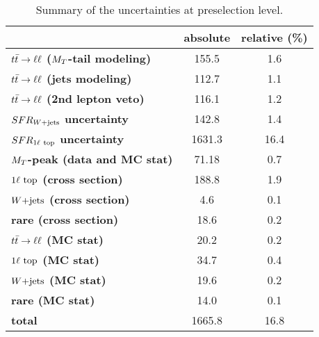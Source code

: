             \begin{table}[!ht]
                \begin{center}
                    \begin{tabular}{|l|c|c|}
                        \hline
                        & \textbf{absolute} & \textbf{relative (\%)}   \\
                        \hline
                        \textbf{$t\bar{t} \rightarrow \ell \ell$ ($M_T$-tail modeling)}       & 155.5    & 1.6  \\
                        \textbf{$t\bar{t} \rightarrow \ell \ell$ (jets modeling)}             & 112.7    & 1.1  \\
                        \textbf{$t\bar{t} \rightarrow \ell \ell$ (2nd lepton veto)}           & 116.1    & 1.2  \\
                        \textbf{$SFR_{\text{$W$+jets}}$ uncertainty}                    & 142.8    & 1.4  \\
                        \textbf{$SFR_{1\ell~\text{top}}$ uncertainty}             & 1631.3   & 16.4 \\
                        \textbf{$M_T$-peak (data and MC stat)}              & 71.18    & 0.7  \\
                        \textbf{$1\ell~\text{top}$ (cross section)}            & 188.8    & 1.9  \\
                        \textbf{$\text{$W$+jets}$ (cross section)}                   & 4.6      & 0.1  \\
                        \textbf{rare (cross section)}                       & 18.6     & 0.2  \\
                        \textbf{$t\bar{t} \rightarrow \ell \ell$ (MC stat)}                   & 20.2     & 0.2  \\
                        \textbf{$1\ell~\text{top}$ (MC stat)}                  & 34.7     & 0.4  \\
                        \textbf{$\text{$W$+jets}$ (MC stat)}                         & 19.6     & 0.2  \\
                        \textbf{rare (MC stat)}                             & 14.0     & 0.1  \\
                        \textbf{total}                                      & 1665.8   & 16.8 \\
                        \hline
                    \end{tabular}
                    \caption{Summary of the uncertainties at preselection level. \label{tab:systematicsPreselection}} 
                \end{center}
            \end{table}

